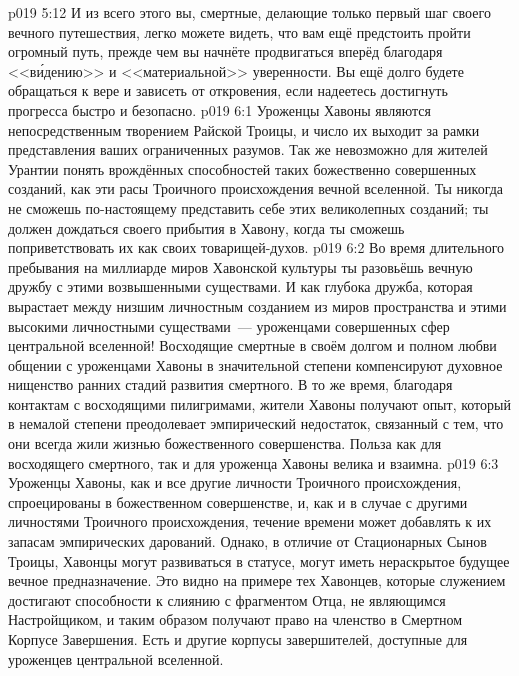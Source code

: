 \vs p019 5:12 И из всего этого вы, смертные, делающие только первый шаг своего вечного путешествия, легко можете видеть, что вам ещё предстоить пройти огромный путь, прежде чем вы начнёте продвигаться вперёд благодаря <<в\'идению>> и <<материальной>> уверенности. Вы ещё долго будете обращаться к вере и зависеть от откровения, если надеетесь достигнуть прогресса быстро и безопасно.
\vs p019 6:1 Уроженцы Хавоны являются непосредственным творением Райской Троицы, и число их выходит за рамки представления ваших ограниченных разумов. Так же невозможно для жителей Урантии понять врождённых способностей таких божественно совершенных созданий, как эти расы Троичного происхождения вечной вселенной. Ты никогда не сможешь по\hyp{}настоящему представить себе этих великолепных созданий; ты должен дождаться своего прибытия в Хавону, когда ты сможешь поприветствовать их как своих товарищей\hyp{}духов.
\vs p019 6:2 Во время длительного пребывания на миллиарде миров Хавонской культуры ты разовьёшь вечную дружбу с этими возвышенными существами. И как глубока дружба, которая вырастает между низшим личностным созданием из миров пространства и этими высокими личностными существами~--- уроженцами совершенных сфер центральной вселенной! Восходящие смертные в своём долгом и полном любви общении с уроженцами Хавоны в значительной степени компенсируют духовное нищенство ранних стадий развития смертного. В то же время, благодаря контактам с восходящими пилигримами, жители Хавоны получают опыт, который в немалой степени преодолевает эмпирический недостаток, связанный с тем, что они всегда жили жизнью божественного совершенства. Польза как для восходящего смертного, так и для уроженца Хавоны велика и взаимна.
\vs p019 6:3 \pc Уроженцы Хавоны, как и все другие личности Троичного происхождения, спроецированы в божественном совершенстве, и, как и в случае с другими личностями Троичного происхождения, течение времени может добавлять к их запасам эмпирических дарований. Однако, в отличие от Стационарных Сынов Троицы, Хавонцы могут развиваться в статусе, могут иметь нераскрытое будущее вечное предназначение. Это видно на примере тех Хавонцев, которые служением достигают способности к слиянию с фрагментом Отца, не являющимся Настройщиком, и таким образом получают право на членство в Смертном Корпусе Завершения. Есть и другие корпусы завершителей, доступные для уроженцев центральной вселенной.
